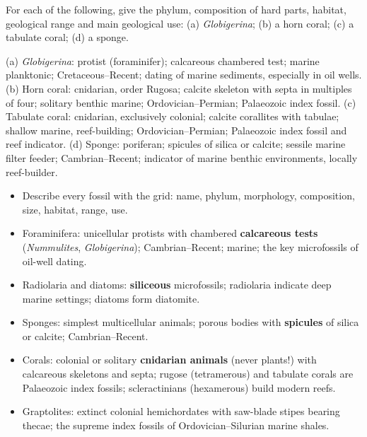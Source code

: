 \documentclass[11pt]{article}
\begin{document}
\begin{exercice}
For each of the following, give the phylum, composition of hard parts, habitat, geological range and main geological use: (a) \emph{Globigerina}; (b) a horn coral; (c) a tabulate coral; (d) a sponge.
\end{exercice}

\begin{corrige}[Exercise 1]
(a) \emph{Globigerina}: protist (foraminifer); calcareous chambered test; marine planktonic; Cretaceous--Recent; dating of marine sediments, especially in oil wells. (b) Horn coral: cnidarian, order Rugosa; calcite skeleton with septa in multiples of four; solitary benthic marine; Ordovician--Permian; Palaeozoic index fossil. (c) Tabulate coral: cnidarian, exclusively colonial; calcite corallites with tabulae; shallow marine, reef-building; Ordovician--Permian; Palaeozoic index fossil and reef indicator. (d) Sponge: poriferan; spicules of silica or calcite; sessile marine filter feeder; Cambrian--Recent; indicator of marine benthic environments, locally reef-builder.
\end{corrige}

\begin{aretenir}
\begin{itemize}
\item Describe every fossil with the grid: name, phylum, morphology, composition, size, habitat, range, use.
\item Foraminifera: unicellular protists with chambered \textbf{calcareous tests} (\emph{Nummulites}, \emph{Globigerina}); Cambrian--Recent; marine; the key microfossils of oil-well dating.
\item Radiolaria and diatoms: \textbf{siliceous} microfossils; radiolaria indicate deep marine settings; diatoms form diatomite.
\item Sponges: simplest multicellular animals; porous bodies with \textbf{spicules} of silica or calcite; Cambrian--Recent.
\item Corals: colonial or solitary \textbf{cnidarian animals} (never plants!) with calcareous skeletons and septa; rugose (tetramerous) and tabulate corals are Palaeozoic index fossils; scleractinians (hexamerous) build modern reefs.
\item Graptolites: extinct colonial hemichordates with saw-blade stipes bearing thecae; the supreme index fossils of Ordovician--Silurian marine shales.
\end{itemize}
\end{aretenir}
\end{document}
